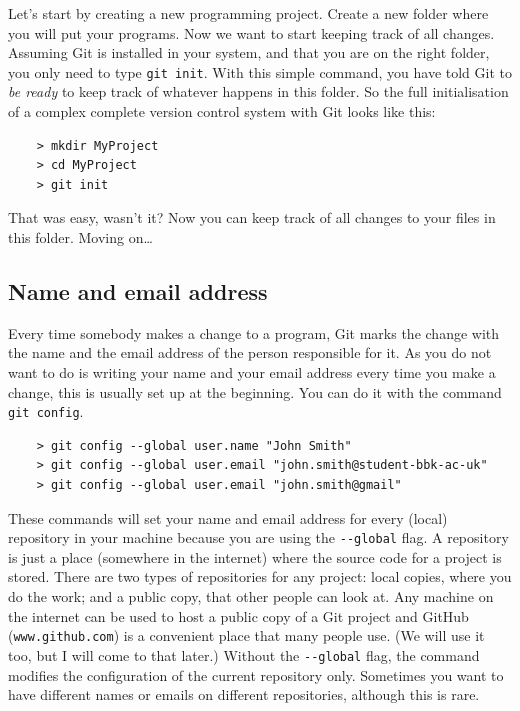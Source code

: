Let's start by creating a new programming project. Create a new folder
where you will put your programs. Now we want to start keeping track
of all changes. Assuming Git is installed in your system, and that you
are on the right folder, you only need to type \verb+git init+. With
this simple command, you have told Git to \emph{be ready} to keep 
track of whatever happens in this folder. So the full initialisation
of a complex complete version control system with Git looks like this: 

\begin{verbatim}
    > mkdir MyProject
    > cd MyProject
    > git init
\end{verbatim}

That was easy, wasn't it? Now you can keep track of all changes to
your files in this folder. Moving on\ldots

\subsection{Name and email address}
\label{sec:name-email-address}

Every time somebody makes a change to a program, Git marks the change
with the name and the email address of the person responsible for it. 
As you do not want to do is writing your
name and your email address every time you make a change, this is
usually set up at the beginning. You can do it with the command 
\verb+git config+. 

\begin{verbatim}
    > git config --global user.name "John Smith"
    > git config --global user.email "john.smith@student-bbk-ac-uk"
    > git config --global user.email "john.smith@gmail"
\end{verbatim}

These commands will set your name and email address for every (local)
repository in your machine because you are using the \verb+--global+
flag. 
%
A repository is just a place (somewhere in the internet) where the
source code for a project is stored. There are two types of 
repositories for any project:
local copies, where you do the work; and a public copy, that other
people can look at. 
Any machine on the internet can
be used to host a public copy of a Git project
and GitHub (\verb+www.github.com+) 
is a convenient place that
many people use. (We will use it too, but I will come to that later.)
%
Without the \verb+--global+ flag, 
the command modifies the configuration of
the current repository only. 
Sometimes you want to have different names or
emails on different repositories, although this is rare. 


